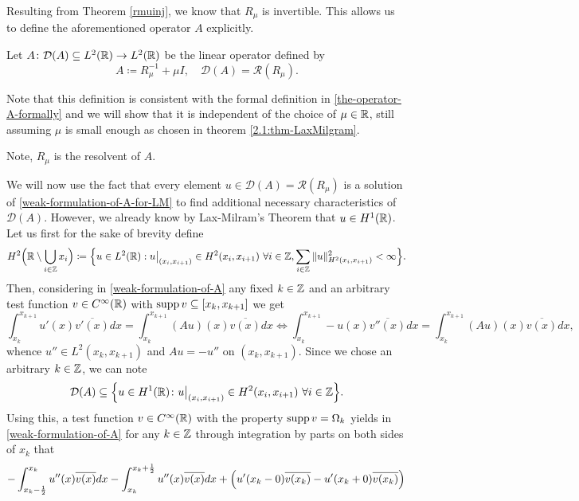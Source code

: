 Resulting from Theorem \ref{rmuinj}, we know that $R_{\mu}$ is invertible. This allows us to define the aforementioned operator $A$ explicitly.
\begin{definition}
	Let $A \colon \mathcal{D}(A) \subseteq L^{2}(\mathbb{R}) \rightarrow L^{2}(\mathbb{R})$ be the linear operator defined by
	\[ A \coloneqq R_{\mu}^{-1} + \mu I, \quad \mathcal{D}(A) = \mathcal{R}(R_{\mu}). \]
\end{definition}
Note that this definition is consistent with the formal definition in \eqref{the-operator-A-formally} and we will show that it is independent of the choice of $\mu \in \mathbb{R}$, still assuming $\mu$ is small enough as chosen in theorem \ref{2.1:thm-LaxMilgram}. 
\begin{remark}
	Note, $R_{\mu}$ is the resolvent of $A$.
\end{remark}
We will now use the fact that every element $u \in \mathcal{D}(A) = \mathcal{R}(R_{\mu})$ is a solution of \eqref{weak-formulation-of-A-for-LM} to find additional necessary  characteristics of $\mathcal{D}(A)$. However, we already know by Lax-Milram's Theorem that $u \in H^{1}(\mathbb{R})$. Let us first for the sake of brevity define
\[ H^{2}\Big(\mathbb{R} \setminus \bigcup_{i \in \mathbb{Z}} x_{i} \Big) \coloneqq \Big\{ u\in L^{2}(\mathbb{R}) : u\big|_{(x_{i}, x_{i+1})} \in H^{2}(x_{i}, x_{i+1}) ~\forall i \in \mathbb{Z}, \sum_{i \in \mathbb{Z}} \|u\|^{2}_{H^{2}(x_{i}, x_{i+1})} < \infty \Big\}. \]
Then, considering in \eqref{weak-formulation-of-A} any fixed $k \in \mathbb{Z}$ and an arbitrary test function $v \in C^{\infty}(\mathbb{R})$ with $\operatorname{supp} v \subseteq [x_{k}, x_{k+1}]$ we get 
	\begin{equation}
		\int_{x_{k}}^{x_{k + 1}} u'(x) \overline{v'(x)} dx = \int_{x_{k}}^{x_{k+1}} \left(Au\right)(x) \overline{v(x)} dx \iff \int_{x_{k}}^{x_{k+1}} - u(x) \overline{v''(x)} dx = \int_{x_{k}}^{x_{k+1}} \left(Au\right)(x) \overline{v(x)} dx, \label{temp-link}
	\end{equation} 
whence $u'' \in L^{2}(x_{k}, x_{k + 1})$ and $A u = - u''$ on $(x_{k}, x_{k + 1})$. Since we chose an arbitrary $k \in \mathbb{Z}$, we can note 
	$$ \mathcal{D}(A) \subseteq \Big\{ u \in H^{1}(\mathbb{R}) \colon u\big|_{(x_{i}, x_{i+1})} \in H^{2}(x_{i}, x_{i+1}) ~\forall i \in \mathbb{Z} \Big\}. $$
Using this, a test function $v \in C^{\infty}(\mathbb{R})$ with the property $\operatorname{supp} v = \Omega_{k}$ yields in \eqref{weak-formulation-of-A} for any $k \in \mathbb{Z}$ through integration by parts on both sides of $x_{k}$ that
	\[ - \int_{x_{k}-\frac{1}{2}}^{x_{k}} u''(x) \overline{v(x)} dx - \int_{x_{k}}^{x_{k} + \frac{1}{2}} u''(x) \overline{v(x)} dx + \left( u'(x_{k}-0) \overline{v(x_{k})} - u'(x_{k} + 0) \overline{v(x_{k})} \right) \\ \]
